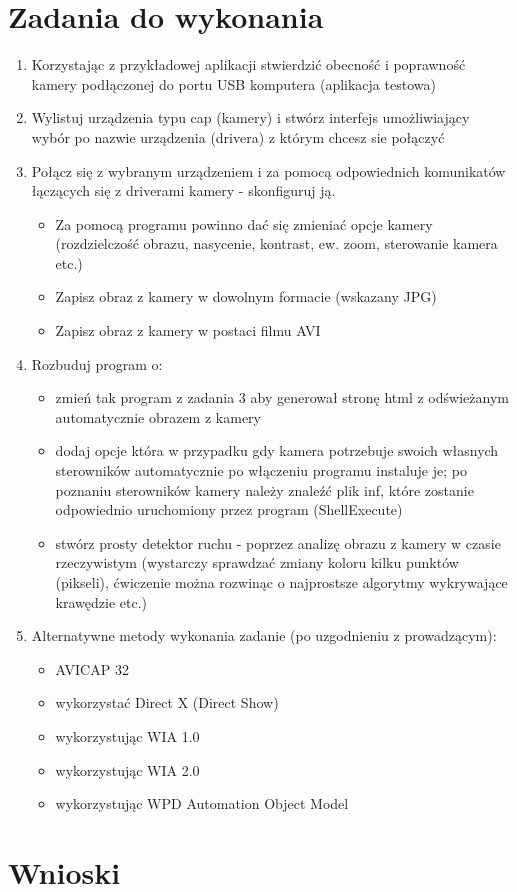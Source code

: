 \documentclass[a4paper,12pt]{extarticle}  %
\begin{document}
\section{Zadania do wykonania}
\begin{enumerate}
	\item Korzystając z przykładowej aplikacji stwierdzić obecność i poprawność kamery podłączonej do portu USB komputera (aplikacja testowa)
	\item Wylistuj urządzenia typu cap (kamery) i stwórz interfejs umożliwiający wybór po nazwie urządzenia (drivera) z którym chcesz sie połączyć
	\item Połącz się z wybranym urządzeniem i za pomocą odpowiednich komunikatów łączących się z driverami kamery - skonfiguruj ją.
	      \begin{itemize}
		      \item Za pomocą programu powinno dać się zmieniać opcje kamery (rozdzielczość obrazu, nasycenie, kontrast, ew. zoom, sterowanie kamera etc.)
		      \item Zapisz obraz z kamery w dowolnym formacie (wskazany JPG)
		      \item Zapisz obraz z kamery w postaci filmu AVI
	      \end{itemize}
	\item Rozbuduj program o:
	      \begin{itemize}
		      \item zmień tak program z zadania 3 aby generował stronę html z odświeżanym automatycznie obrazem z kamery
		      \item dodaj opcje która w przypadku gdy kamera potrzebuje swoich własnych sterowników automatycznie po włączeniu programu instaluje je; po poznaniu sterowników kamery należy znaleźć plik inf, które zostanie odpowiednio uruchomiony przez program (ShellExecute)
		      \item stwórz prosty detektor ruchu - poprzez analizę obrazu z kamery w czasie rzeczywistym (wystarczy sprawdzać zmiany koloru kilku punktów (pikseli), ćwiczenie można rozwinąc o najprostsze algorytmy wykrywające krawędzie etc.)
	      \end{itemize}
	\item Alternatywne metody wykonania zadanie (po uzgodnieniu z prowadzącym):
	      \begin{itemize}
		      \item AVICAP 32
		      \item wykorzystać Direct X (Direct Show)
		      \item wykorzystując WIA 1.0
		      \item wykorzystując WIA 2.0
		      \item wykorzystując WPD Automation Object Model
	      \end{itemize}
\end{enumerate}
\section{Wnioski}
\end{document}
